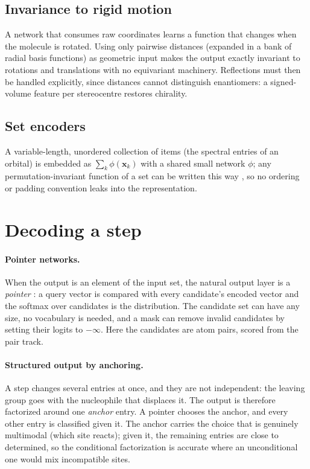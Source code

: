 \documentclass[11pt,a4paper]{article}
\newcommand{\vb}[1]{\bm{#1}}
\begin{document}
\subsection{Invariance to rigid motion}
A network that consumes raw coordinates learns a function that changes when the molecule is rotated. Using only pairwise distances (expanded in a bank of radial basis functions) as geometric input makes the output exactly invariant to rotations and translations with no equivariant machinery. Reflections must then be handled explicitly, since distances cannot distinguish enantiomers: a signed-volume feature per stereocentre restores chirality.

\subsection{Set encoders}
A variable-length, unordered collection of items (the spectral entries of an orbital) is embedded as $\sum_k\phi(\vb{x}_k)$ with a shared small network $\phi$; any permutation-invariant function of a set can be written this way \cite{deepsets}, so no ordering or padding convention leaks into the representation.

\section{Decoding a step}
\label{sec:decode}
\paragraph{Pointer networks.} When the output is an element of the input set, the natural output layer is a \emph{pointer} \cite{pointer}: a query vector is compared with every candidate's encoded vector and the softmax over candidates is the distribution. The candidate set can have any size, no vocabulary is needed, and a mask can remove invalid candidates by setting their logits to $-\infty$. Here the candidates are atom pairs, scored from the pair track.

\paragraph{Structured output by anchoring.} A step changes several entries at once, and they are not independent: the leaving group goes with the nucleophile that displaces it. The output is therefore factorized around one \emph{anchor} entry. A pointer chooses the anchor, and every other entry is classified given it. The anchor carries the choice that is genuinely multimodal (which site reacts); given it, the remaining entries are close to determined, so the conditional factorization is accurate where an unconditional one would mix incompatible sites.
\end{document}
